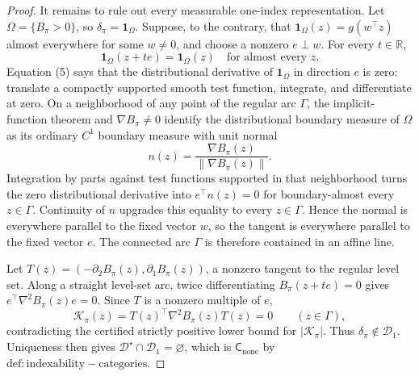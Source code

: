 \documentclass{article}
\begin{document}
\begin{proof}
It remains to rule out every measurable one-index representation. Let \(\Omega=\{B_{\pi}>0\}\), so \(\delta_{\pi}=\mathbf1_{\Omega}\). Suppose, to the contrary, that \(\mathbf1_{\Omega}(z)=g(w^{\top}z)\) almost everywhere for some \(w\neq0\), and choose a nonzero \(e\perp w\). For every \(t\in\mathbb R\),
\[
 \mathbf1_{\Omega}(z+te)=\mathbf1_{\Omega}(z)\quad\text{for almost every }z. \tag{5}
\]
Equation (5) says that the distributional derivative of \(\mathbf1_{\Omega}\) in direction \(e\) is zero: translate a compactly supported smooth test function, integrate, and differentiate at zero. On a neighborhood of any point of the regular arc \(\Gamma\), the implicit-function theorem and \(\nabla B_{\pi}\neq0\) identify the distributional boundary measure of \(\Omega\) as its ordinary \(C^1\) boundary measure with unit normal
\[
 n(z)=\frac{\nabla B_{\pi}(z)}{\|\nabla B_{\pi}(z)\|}.
\]
Integration by parts against test functions supported in that neighborhood turns the zero distributional derivative into \(e^{\top}n(z)=0\) for boundary-almost every \(z\in\Gamma\). Continuity of \(n\) upgrades this equality to every \(z\in\Gamma\). Hence the normal is everywhere parallel to the fixed vector \(w\), so the tangent is everywhere parallel to the fixed vector \(e\). The connected arc \(\Gamma\) is therefore contained in an affine line.

Let \(T(z)=(-\partial_2B_{\pi}(z),\partial_1B_{\pi}(z))\), a nonzero tangent to the regular level set. Along a straight level-set arc, twice differentiating \(B_{\pi}(z+te)=0\) gives \(e^{\top}\nabla^2B_{\pi}(z)e=0\). Since \(T\) is a nonzero multiple of \(e\),
\[
 \mathcal K_{\pi}(z)=T(z)^{\top}\nabla^2B_{\pi}(z)T(z)=0
 \qquad(z\in\Gamma),
\]
contradicting the certified strictly positive lower bound for \(|\mathcal K_{\pi}|\). Thus \(\delta_{\pi}\notin\mathcal D_1\). Uniqueness then gives \(\mathcal D^{\star}\cap\mathcal D_1=\varnothing\), which is \(\mathsf C_{\mathrm{none}}\) by \(\mathrm{def:indexability-categories}\).
\end{proof}
\end{document}
